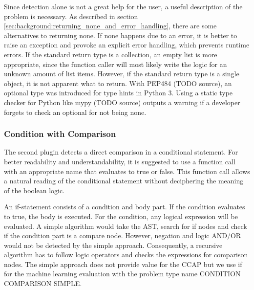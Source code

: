 Since detection alone is not a great help for the user, a useful description of the problem is necessary. 
As described in section \ref{sec:background:returning_none_and_error_handling}, there are some alternatives to returning none. If none happens due to an error, it is better to raise an exception and provoke an explicit error handling, which prevents runtime errors. If the standard return type is a collection, an empty list is more appropriate, since the function caller will most likely write the logic for an unknown amount of list items. However, if the standard return type is a single object, it is not apparent what to return. With PEP484 (TODO source), an optional type was introduced for type hints in Python 3. Using a static type checker for Python like mypy (TODO source) outputs a warning if a developer forgets to check an optional for not being none. 

\subsubsection{Condition with Comparison}\label{sec:condition_comparison}
The second plugin detects a direct comparison in a conditional statement. For better readability and understandability, it is suggested to use a function call with an appropriate name that evaluates to true or false. This function call allows a natural reading of the conditional statement without deciphering the meaning of the boolean logic.

An if-statement consists of a condition and body part. If the condition evaluates to true, the body is executed. For the condition, any logical expression will be evaluated. A simple algorithm would take the AST, search for if nodes and check if the condition part is a compare node.
However, negation and logic AND/OR would not be detected by the simple approach. Consequently, a recursive algorithm has to follow logic operators and checks the expressions for comparison nodes. The simple approach does not provide value for the CCAP but we use if for the machine learning evaluation with the problem type name CONDITION COMPARISON SIMPLE.

